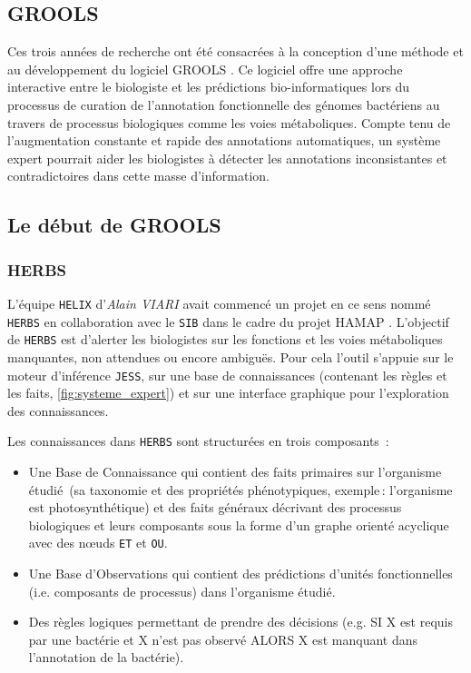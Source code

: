 \begin{refsegment}
\chapter{GROOLS}

Ces trois années de recherche ont été consacrées à la conception d’une méthode et au développement du logiciel \gls{GROOLS} . Ce logiciel offre une approche interactive entre le biologiste et les prédictions bio-informatiques lors du processus de curation de l'annotation fonctionnelle des génomes bactériens au travers de processus biologiques comme les voies métaboliques. Compte tenu de l'augmentation constante et rapide des annotations automatiques, un système expert pourrait aider les biologistes à détecter les annotations inconsistantes et contradictoires dans cette masse d'information. 

\section{Le début de GROOLS}

\subsection{HERBS}

L'équipe \texttt{HELIX} d'\textit{Alain VIARI} avait commencé un projet en ce sens nommé \texttt{\gls{HERBS}} en collaboration avec le \texttt{\gls{SIB}} dans le cadre du projet \gls{HAMAP} \cite{pedruzzi2015hamap}. L'objectif de \texttt{\gls{HERBS}} est d'alerter les biologistes sur les fonctions et les voies métaboliques manquantes, non attendues ou encore ambiguës. Pour cela l'outil s'appuie sur le moteur d'inférence \texttt{\gls{JESS}}, sur une base de connaissances (contenant les règles et les faits, \cref{fig:systeme_expert}) et sur une interface graphique pour l'exploration des connaissances. 

Les connaissances dans \texttt{HERBS} sont structurées en trois composants :\nolisttopbreak
\begin{itemize}
	\item Une Base de Connaissance qui contient des faits primaires sur l’organisme étudié (sa taxonomie  et des propriétés phénotypiques, exemple : l’organisme est photosynthétique) et des faits généraux décrivant des processus biologiques et leurs composants sous la forme d’un  graphe orienté acyclique avec des nœuds \texttt{ET} et \texttt{OU}.
	\item Une Base d’Observations qui contient des prédictions d’unités fonctionnelles (i.e. composants de processus) dans l’organisme étudié.
	\item Des règles logiques permettant de prendre des décisions (e.g. SI X est requis par une bactérie et X n’est pas observé ALORS X est manquant dans l’annotation de la bactérie).
\end{itemize}


\end{refsegment}
